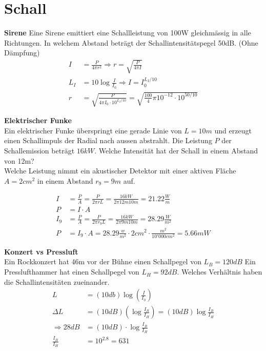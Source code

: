 \newpage

\section{Schall}
\textbf{Sirene}
Eine Sirene emittiert eine Schallleistung von 100W gleichmässig in alle Richtungen. In welchem Abstand beträgt der Schallintensitätspegel 50dB. (Ohne Dämpfung)
\begin{align*}
I&=\frac{P}{4\pi r^2} \Rightarrow r = \sqrt{\frac{P}{4\pi I}}\\
L_I &= 10\log  \frac{I}{I_0} \Rightarrow I = I_0^{L_I/10}\\
r &= \sqrt{\frac{P}{4\pi I_0 \cdot 10^{L_I/10}}} = \sqrt{\frac{100}4\pi 10^{-12} \cdot 10^{50/10}}
\end{align*}

\textbf{Elektrischer Funke}\\
Ein elektrischer Funke überspringt eine gerade Linie von $L=10m$ und erzeugt einen Schallimpuls der Radial nach aussen abstrahlt. Die Leistung $P$ der Schallemission beträgt  $16kW$. Welche Intensität hat der Schall in einem Abstand von 12m?\\
Welche Leistung nimmt ein akustischer Detektor mit einer aktiven Fläche $A=2cm^2$ in einem Abstand $r_9=9m$ auf.

\begin{align*}
I&=\frac{P}{A} = \frac{P}{2\pi r L} = \frac{16kW}{2\pi 12m 10m} = 21.22\frac{W}{m}\\
P&=I\cdot A\\
I_9&=\frac{P}{A} = \frac{P}{2\pi r_9 L} = \frac{16kW}{2\pi 9m 10m} = 28.29\frac{W}{m^2}\\
P&= I_9\cdot A = 28.29\frac{w}{m^2} \cdot 2cm^2 \cdot \frac{m^2}{10'000 cm^2} = 5.66mW
\end{align*}

\textbf{Konzert vs Pressluft}\\
Ein Rockkonzert hat 46m vor der Bühne einen Schallpegel von $L_B = 120dB$ Ein Presslufthammer hat einen Schallpegel von $L_H = 92dB$. Welches Verhältnis haben die Schallintensitäten zueinander.
\begin{align*}
L&= (10db) \log\left(\frac{I}{I_0}\right)\\
\Delta L &=(10dB)\left(\log\frac{I_B}{I_H}\right) = (10dB) \log \frac{I_B}{I_H}\\
\Rightarrow 28dB &= (10dB) \cdot  \log\frac{I_B}{I_H}\\
\frac{I_B}{I_H} &= 10^{2.8} = 631
\end{align*}